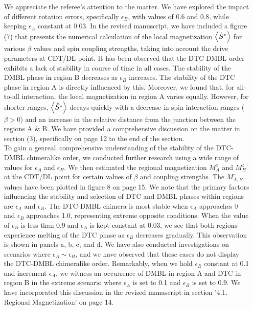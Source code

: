 \documentclass[10pt,
superscriptaddress,
amsmath,amssymb,showkeys,
aps, 
prb,
]{revtex4-2}
\newcommand{\response}[1]{{\color{black}#1}} %
\begin{document}
\begin{enumerate}
\begin{enumerate}
		\response{We appreciate the referee's attention to the matter. We have explored the impact of different rotation errors, specifically $\epsilon_B$, with values of 0.6 and 0.8, while keeping $\epsilon_A$ constant at 0.03. In the revised manuscript, we have included a figure (7) that presents the numerical calculation of the local magnetization $\expval{\hat{S}^z}$ for various $\beta$ values and spin coupling strengths, taking into account the drive parameters at CDT/DL point. It has been observed that the DTC-DMBL order exhibits a lack of stability in course of time in all cases. The stability of the DMBL phase in region B decreases as $\epsilon_B$ increases. The stability of the DTC phase in region A is directly influenced by this. Moreover, we found that, for all-to-all interaction, the local magnetization in region A varies equally. However, for shorter ranges, $\expval{\hat{S}^z}$ decays quickly with a decrease in spin interaction ranges ($\beta >0$) and an increase in the relative distance from the junction between the regions A $\&$ B. We have provided a comprehensive discussion on the matter in section (3), specifically on page 12 to the end of the section.\\
			
		To gain a genreal comprehensive understanding of the stability of the DTC-DMBL chimeralike order, we conducted further research using a wide range of values for $\epsilon_A$ and $\epsilon_B$. We then estimated the regional magnetization $M^z_A$ and $M^z_B$ at the CDT/DL point for certain values of $\beta$ and coupling strengths. The $M^z_{A,B}$ values have been plotted in figure 8 on page 15. We note that the primary factors influencing the stability and selection of DTC and DMBL phases within regions are $\epsilon_A$ and $\epsilon_B$. The DTC-DMBL chimera is most stable when $\epsilon_A$ approaches 0 and $\epsilon_B$ approaches 1.0, representing extreme opposite conditions. When the value of $\epsilon_B$ is less than 0.9 and $\epsilon_A$ is kept constant at 0.03, we see that both regions experience melting of the DTC phase as $\epsilon_B$ decreases gradually. This observation is shown in panels a, b, c, and d. We have also conducted investigations on scenarios where $\epsilon_A\sim\epsilon_B$, and we have observed that these cases do not display the DTC-DMBL chimeralike order. Remarkably, when we hold $\epsilon_B$ constant at 0.1 and increment $\epsilon_A$, we witness an occurrence of DMBL in region A and DTC in region B in the extreme scenario where $\epsilon_A$ is set to 0.1 and $\epsilon_B$ is set to 0.9. We have incorporated this discussion in the revised manuscript in section '4.1. Regional Magnetization' on page 14.
		
}
\end{enumerate}
\end{enumerate}
\end{document}
